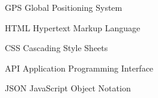 \begin{siglas}
  \item[GPS] Global Positioning System
  \item[HTML] Hypertext Markup Language
  \item[CSS] Cascading Style Sheets
  \item[API] Application Programming Interface
  \item[JSON] JavaScript Object Notation
\end{siglas}
